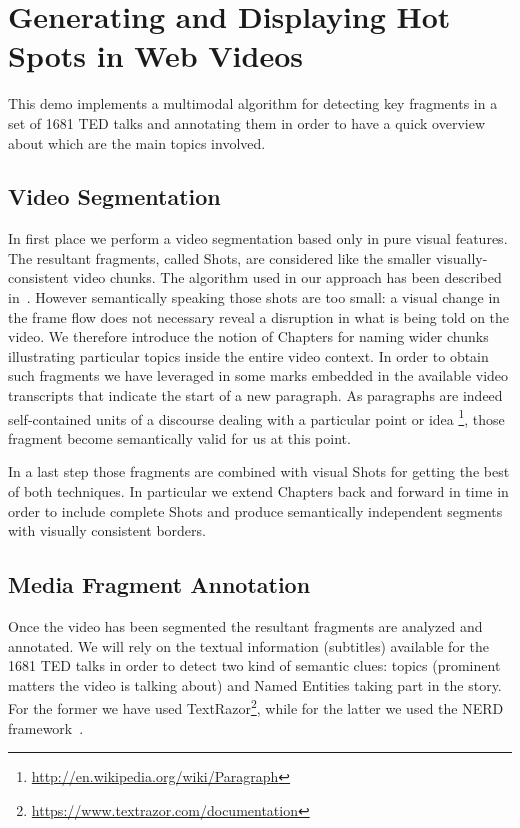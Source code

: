 \documentclass{llncs}
\begin{document}

\section{Generating and Displaying Hot Spots in Web Videos}
\label{sec:hotspots}
This demo implements a multimodal algorithm for detecting key fragments in a set of 1681 TED talks and annotating them in order to have a quick overview about which are the main topics involved.

\subsection{Video Segmentation}
\label{sec:fragmentsgeneration}
In first place we perform a video segmentation based only in pure visual features. The resultant fragments, called Shots, are considered like the smaller visually-consistent video chunks. The algorithm used in our approach has been described in~\cite{sidiropoulos2011temporal}. However semantically speaking those shots are too small: a visual change in the frame flow does not necessary reveal a disruption in what is being told on the video. We therefore introduce the notion of Chapters for naming wider chunks illustrating particular topics inside the entire video context. In order to obtain such fragments we have leveraged in some marks embedded in the available video transcripts that indicate the start of a new paragraph. As paragraphs are indeed self-contained units of a discourse dealing with a particular point or idea \footnote{\fontsize{8pt}{1em}\selectfont \url{http://en.wikipedia.org/wiki/Paragraph}}, those fragment become semantically valid for us at this point.

In a last step those fragments are combined with visual Shots for getting the best of both techniques. In particular we extend Chapters back and forward in time in order to include complete Shots and produce semantically independent segments with visually consistent borders.

\subsection{Media Fragment Annotation}
\label{sec:videoannotation}
Once the video has been segmented the resultant fragments are analyzed and annotated. We will rely on the textual information (subtitles) available for the 1681 TED talks in order to detect two kind of semantic clues: topics (prominent matters the video is talking about) and Named Entities taking part in the story. For the former we have used TextRazor\footnote{\fontsize{8pt}{1em}\selectfont \url{https://www.textrazor.com/documentation}}, while for the latter we used the NERD framework~\cite{Rizzo2012b}.
\end{document}
